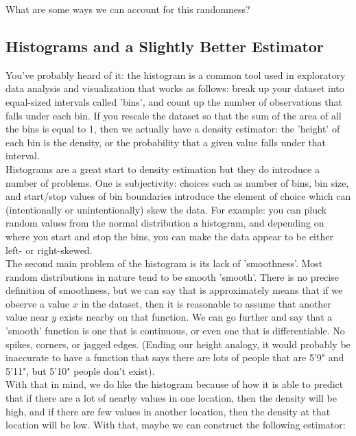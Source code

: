 \documentclass[12pt]{article}
\begin{document}
What are some ways we can account for this randomness?

\subsection{Histograms and a Slightly Better Estimator}

You've probably heard of it: the histogram is a common tool used in exploratory data analysis and visualization that works as follows: break up your dataset into equal-sized intervals called 'bins', and count up the number of observations that falls under each bin. If you rescale the dataset so that the sum of the area of all the bins is equal to 1, then we actually have a density estimator: the 'height' of each bin is the density, or the probability that a given value falls under that interval. \\

Histograms are a great start to density estimation but they do introduce a number of problems. One is subjectivity: choices such as number of bins, bin size, and start/stop values of bin boundaries introduce the element of choice which can (intentionally or unintentionally) skew the data. For example: you can pluck random values from the normal distribution a histogram, and depending on where you start and stop the bins, you can make the data appear to be either left- or right-skewed. \\

The second main problem of the histogram is its lack of 'smoothness'. Most random distributions in nature tend to be smooth 'smooth'. There is no precise definition of smoothness, but we can say that is approximately means that if we observe a value $x$ in the dataset, then it is reasonable to assume that another value near $y$ exists nearby on that function. We can go further and say that a 'smooth' function is one that is continuous, or even one that is differentiable. No spikes, corners, or jagged edges. (Ending our height analogy, it would probably be inaccurate to have a function that says there are lots of people that are 5'9" and 5'11", but 5'10" people don't exist). \\

With that in mind, we do like the histogram because of how it is able to predict that if there are a lot of nearby values in one location, then the density will be high, and if there are few values in another location, then the density at that location will be low. With that, maybe we can construct the following estimator: 
\end{document}
